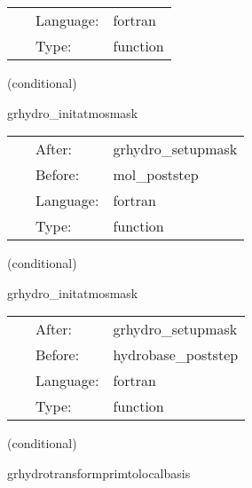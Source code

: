  \begin{tabular*}{160mm}{cll} 
~ & Language:  & fortran \\ 
~ & Type:  & function \\ 
\end{tabular*} 


\vspace{5mm}

   (conditional) 

\hspace{5mm} grhydro\_initatmosmask 

\hspace{5mm}{\it set the atmosphere mask } 


\hspace{5mm}

 \begin{tabular*}{160mm}{cll} 
~ & After:  & grhydro\_setupmask \\ 
~ & Before:  & mol\_poststep \\ 
~ & Language:  & fortran \\ 
~ & Type:  & function \\ 
\end{tabular*} 


\vspace{5mm}

   (conditional) 

\hspace{5mm} grhydro\_initatmosmask 

\hspace{5mm}{\it set the atmosphere mask } 


\hspace{5mm}

 \begin{tabular*}{160mm}{cll} 
~ & After:  & grhydro\_setupmask \\ 
~ & Before:  & hydrobase\_poststep \\ 
~ & Language:  & fortran \\ 
~ & Type:  & function \\ 
\end{tabular*} 


\vspace{5mm}

   (conditional) 

\hspace{5mm} grhydrotransformprimtolocalbasis 

\hspace{5mm}{\it transform primitive vars to local tensor basis. } 


